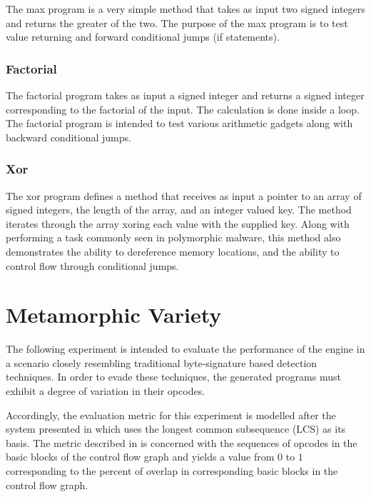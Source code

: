             The max program is a very simple method that takes as input two
            signed integers and returns the greater of the two. The purpose
            of the max program is to test value returning and forward
            conditional jumps (if statements).

        \subsubsection{Factorial}

            The factorial program takes as input a signed integer and
            returns a signed integer corresponding to the factorial of the
            input. The calculation is done inside a loop. The factorial
            program is intended to test various arithmetic gadgets along
            with backward conditional jumps.

        \subsubsection{Xor}

            The xor program defines a method that receives as input a
            pointer to an array of signed integers, the length of the array,
            and an integer valued key. The method iterates through the array
            xoring each value with the supplied key. Along with performing a
            task commonly seen in polymorphic malware, this method also
            demonstrates the ability to dereference memory locations, and
            the ability to control flow through conditional jumps.
        
\section{Metamorphic Variety}
    
    The following experiment is intended to evaluate the performance of the
    engine in a scenario closely resembling traditional byte-signature based
    detection techniques. In order to evade these techniques, the generated
    programs must exhibit a degree of variation in their opcodes.

    Accordingly, the evaluation metric for this experiment is modelled after
    the system presented in \cite{cfg_lcs} which uses the longest common
    subsequence (LCS) as its basis. The metric described in \cite{cfg_lcs}
    is concerned with the sequences of opcodes in the basic blocks of the
    control flow graph and yields a value from $0$ to $1$ corresponding to
    the percent of overlap in corresponding basic blocks in the control flow
    graph.
    
